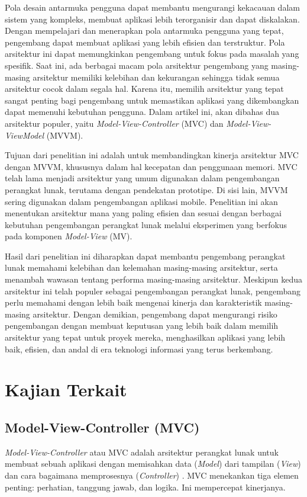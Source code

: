 \documentclass[conference]{IEEEtran}
\begin{document}
	Pola desain antarmuka pengguna dapat membantu mengurangi kekacauan dalam sistem yang kompleks, membuat aplikasi lebih terorganisir dan dapat diskalakan. Dengan mempelajari dan menerapkan pola antarmuka pengguna yang tepat, pengembang dapat membuat aplikasi yang lebih efisien dan terstruktur. Pola arsitektur ini dapat memungkinkan pengembang untuk fokus pada masalah yang spesifik. Saat ini, ada berbagai macam pola arsitektur pengembang yang masing-masing arsitektur memiliki kelebihan dan kekurangan sehingga tidak semua arsitektur cocok dalam segala hal. Karena itu, memilih arsitektur yang tepat sangat penting bagi pengembang untuk memastikan aplikasi yang dikembangkan dapat memenuhi kebutuhan pengguna. Dalam artikel ini, akan dibahas dua arsitektur populer, yaitu \textit{Model-View-Controller} (MVC) dan \textit{Model-View-ViewModel} (MVVM).
	
	Tujuan dari penelitian ini adalah untuk membandingkan kinerja arsitektur MVC dengan MVVM, khususnya dalam hal kecepatan dan penggunaan memori. MVC telah lama menjadi arsitektur yang umum digunakan dalam pengembangan perangkat lunak, terutama dengan pendekatan prototipe. Di sisi lain, MVVM sering digunakan dalam pengembangan aplikasi mobile. Penelitian ini akan menentukan arsitektur mana yang paling efisien dan sesuai dengan berbagai kebutuhan pengembangan perangkat lunak melalui eksperimen yang berfokus pada komponen \textit{Model-View} (MV).
	
	Hasil dari penelitian ini diharapkan dapat membantu pengembang perangkat lunak memahami kelebihan dan kelemahan masing-masing arsitektur, serta menambah wawasan tentang performa masing-masing arsitektur. Meskipun kedua arsitektur ini telah populer sebagai pengembangan perangkat lunak, pengembang perlu memahami dengan lebih baik mengenai kinerja dan karakteristik masing-masing arsitektur. Dengan demikian, pengembang dapat mengurangi risiko pengembangan dengan membuat keputusan yang lebih baik dalam memilih arsitektur yang tepat untuk proyek mereka, menghasilkan aplikasi yang lebih baik, efisien, dan andal di era teknologi informasi yang terus berkembang.
	
	
	\section{Kajian Terkait}
	
	\subsection{Model-View-Controller (MVC)}
	\textit{Model-View-Controller} atau MVC adalah arsitektur perangkat lunak untuk membuat sebuah aplikasi dengan memisahkan data (\textit{Model}) dari tampilan (\textit{View}) dan cara bagaimana memprosesnya (\textit{Controller})\cite{Perbandingan4} \cite{MVC} . MVC menekankan tiga elemen penting: perhatian, tanggung jawab, dan logika. Ini mempercepat kinerjanya.
	
\end{document}
